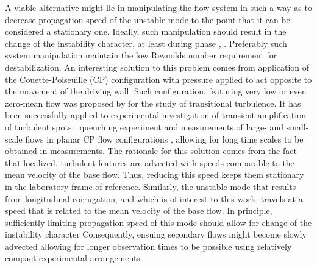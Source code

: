 \documentclass[lineno]{jfm}
\begin{document}
A viable alternative might lie in manipulating the flow system in such a way as to decrease propagation speed of the unstable mode to the point that it can be considered a stationary one.
Ideally, such manipulation should result in the change of the instability character,
at least during   phase ,
.
Preferably such system manipulation   maintain the low Reynolds number requirement for destabilization.
An interesting solution to this problem comes from application of the Couette-Poiseuille (CP) configuration with pressure applied to act opposite to the movement of the driving wall.
Such configuration, featuring very low or even zero-mean flow was proposed by \citet{Klotz_2017_prf} for the study of transitional turbulence.
It has been successfully applied to experimental investigation of transient amplification of turbulent spots \citep{Klotz_2017_jfm}, quenching experiment \citep{liu_klotz_2021} and measurements of large- and small-scale flows in planar CP flow configurations \citep{klotz2021experimental}, allowing for long time scales to be obtained in measurements.
The rationale for this solution comes from the fact that localized, turbulent features are advected with speeds comparable to the mean velocity of the base flow.
Thus, reducing this speed keeps them stationary in the laboratory frame of reference.
Similarly, the unstable mode that results from longitudinal corrugation, and which is of interest to this work, travels at a speed that is related to the mean velocity of the base flow.
In principle, sufficiently limiting propagation speed of this mode should allow for
  change of the instability character 
Consequently, ensuing secondary flows might become  slowly advected  allowing for longer observation times to be possible using relatively compact experimental arrangements.
\end{document}
